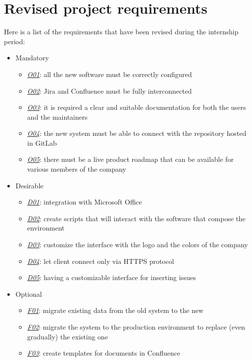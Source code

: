 \newpage
\section{Revised project requirements}
	Here is a list of the requirements that have been revised during the internship period:
	\begin{itemize}
		\item Mandatory
		\begin{itemize}
			\item \underline{\textit{O01}}: all the new software must be correctly configured
			\item \underline{\textit{O02}}: Jira and Confluence must be fully interconnected
			\item \underline{\textit{O03}}: it is required a clear and suitable documentation for both the users and the maintainers
			\item \underline{\textit{O04}}: the new system must be able to connect with the repository hosted in GitLab
			\item \underline{\textit{O05}}: there must be a live product roadmap that can be available for various members of the company
		\end{itemize}
		\item Desirable
		\begin{itemize}
			\item \underline{\textit{D01}}: integration with Microsoft Office
			\item \underline{\textit{D02}}: create scripts that will interact with the software that compose the environment
			\item \underline{\textit{D03}}: customize the interface with the logo and the colors of the company
			\item \underline{\textit{D04}}: let client connect only via HTTPS protocol
			\item \underline{\textit{D05}}: having a customizable interface for inserting issues
		\end{itemize}
		\item Optional
		\begin{itemize}
			\item \underline{\textit{F01}}: migrate existing data from the old system to the new
			\item \underline{\textit{F02}}: migrate the system to the production environment to replace (even gradually) the existing one
			\item \underline{\textit{F03}}: create templates for documents in Confluence
		\end{itemize} 
	\end{itemize}